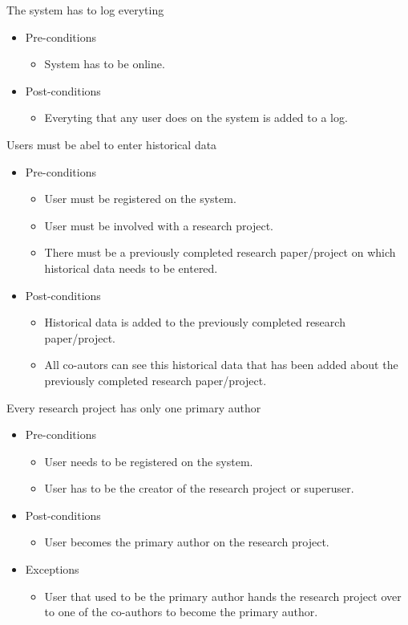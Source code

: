 \documentclass[a4paper,12pt]{report}
\begin{document}
	The system has to log everyting
	\begin{itemize}
		\item Pre-conditions
			\begin{itemize}
				\item System has to be online.
			\end{itemize}
		\item Post-conditions
			\begin{itemize}
				\item Everyting that any user does on the system is added to a log.
			\end{itemize}
	\end{itemize}

	Users must be abel to enter historical data
	\begin{itemize}
		\item Pre-conditions
			\begin{itemize}
				\item User must be registered on the system.
				\item User must be involved with a research project.
				\item There must be a previously completed research paper/project on which historical data needs to be entered.
			\end{itemize}
		\item Post-conditions
			\begin{itemize}
				\item Historical data is added to the previously completed research paper/project.
				\item All co-autors can see this historical data that has been added about the previously completed research paper/project.
			\end{itemize}
	\end{itemize}

	Every research project has only one primary author
	\begin{itemize}
		\item Pre-conditions
			\begin{itemize}
				\item User needs to be registered on the system.
				\item User has to be the creator of the research project or superuser.
			\end{itemize}
		\item Post-conditions
			\begin{itemize}
				\item User becomes the primary author on the research project.
			\end{itemize}
		\item Exceptions
			\begin{itemize}
				\item User that used to be the primary author hands the research project over to one of the co-authors to become the primary author.
			\end{itemize}
	\end{itemize}
\end{document}
